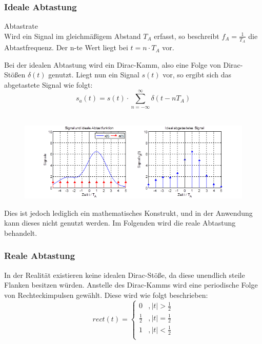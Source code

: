 \subsubsection{Ideale Abtastung}
\begin{definition}{Abtastrate}\\
Wird ein Signal im gleichmäßigem Abstand $T_A$ erfasst, so beschreibt $f_A = \frac{1}{T_A}$ die Abtastfrequenz. Der n-te Wert liegt bei $t = n \cdot T_A$ vor.
\end{definition}

Bei der idealen Abtastung wird ein Dirac-Kamm, also eine Folge von Dirac-Stößen $\delta(t)$ genutzt. Liegt nun ein Signal $s(t)$ vor, so ergibt sich das abgetastete Signal wie folgt:\\
$$s_a(t) = s(t) \cdot \sum_{n=-\infty}^{\infty} \delta(t - nT_A)$$\\

\begin{figure}[h!]
\centering
\includegraphics[scale=1]{images/abtastung_ideal.png}
\label{ideal_abtastung}
\end{figure}


Dies ist jedoch lediglich ein mathematisches Konstrukt, und in der Anwendung kann dieses nicht genutzt werden. Im Folgenden wird die reale Abtastung behandelt.

\subsubsection{Reale Abtastung}
In der Realität existieren keine idealen Dirac-Stöße, da diese unendlich steile Flanken besitzen würden. Anstelle des Dirac-Kamms wird eine periodische Folge von Rechteckimpulsen gewählt. Diese wird wie folgt beschrieben:\\
\begin{equation}
   rect(t) =
   \begin{cases}
     0 & ,|t| > \frac{1}{2}\\
     \frac{1}{2} & ,|t| = \frac{1}{2}\\
     1 & ,|t| < \frac{1}{2}\\
   \end{cases}
\end{equation}

